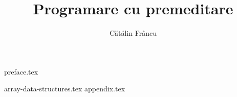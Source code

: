 \documentclass[12pt,openany]{book}
\title{Programare cu premeditare}
\author{Cătălin Frâncu}
\date{}
\begin{document}
\pagestyle{plain}

\hypersetup{pageanchor=false}

\begin{titlepage}
\maketitle
\end{titlepage}

\hypersetup{pageanchor=true}
\cleardoublepage

\mainmatter

{preface.tex}

\pagestyle{fancy}

\raggedbottom

\begingroup
\hypersetup{hidelinks} %
\tableofcontents
\endgroup

\cleardoublepage

{array-data-structures.tex}
{appendix.tex}
\end{document}

